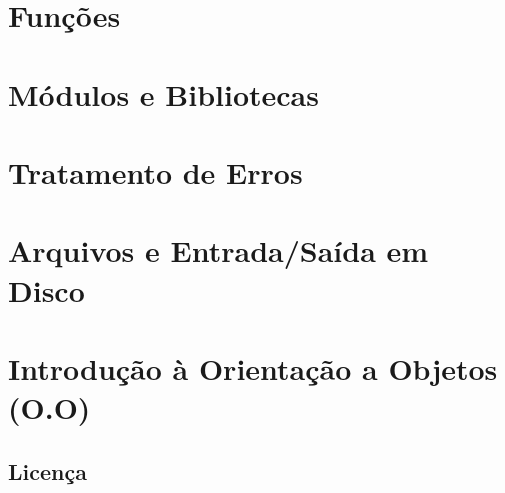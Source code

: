 \documentclass[12pt]{book}
\begin{document}
	
	\chapter{Funções}
	
	\chapter{Módulos e Bibliotecas}
	
	\chapter{Tratamento de Erros}
	
	\chapter{Arquivos e Entrada/Saída em Disco}
	
	\chapter{Introdução à Orientação a Objetos (O.O)}
	
	
	
	\newpage
	\section*{Licença \faCreativeCommons}
	
\end{document}
